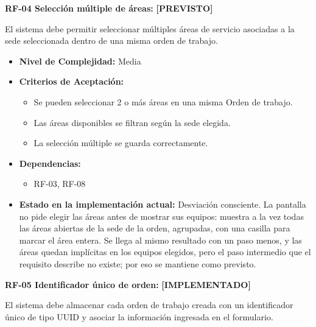 \documentclass[12pt,a4paper]{article}
\newcommand{\estadoImplementado}{\textcolor{mainRed}{\textbf{[IMPLEMENTADO]}}}
\newcommand{\estadoPrevisto}{\textcolor{mainGray}{\textbf{[PREVISTO]}}}
\begin{document}
\textbf{RF-04 Selección múltiple de áreas:} \estadoPrevisto{}

El sistema debe permitir seleccionar múltiples áreas de servicio asociadas a la sede seleccionada dentro de una misma orden de trabajo.

\begin{itemize}
  \item \textbf{Nivel de Complejidad:} Media

  \item \textbf{Criterios de Aceptación:}
  \begin{itemize}
    \item Se pueden seleccionar 2 o más áreas en una misma Orden de trabajo.
    \item Las áreas disponibles se filtran según la sede elegida.
    \item La selección múltiple se guarda correctamente.
  \end{itemize}

  \item \textbf{Dependencias:}
  \begin{itemize}
    \item RF-03, RF-08
  \end{itemize}

  \item \textbf{Estado en la implementación actual:} Desviación consciente. La pantalla no pide elegir las áreas antes de mostrar sus equipos: muestra a la vez todas las áreas abiertas de la sede de la orden, agrupadas, con una casilla para marcar el área entera. Se llega al mismo resultado con un paso menos, y las áreas quedan implícitas en los equipos elegidos, pero el paso intermedio que el requisito describe no existe; por eso se mantiene como previsto.
\end{itemize}

\textbf{RF-05 Identificador único de orden:} \estadoImplementado{}

El sistema debe almacenar cada orden de trabajo creada con un identificador único de tipo UUID y asociar la información ingresada en el formulario.
\end{document}
